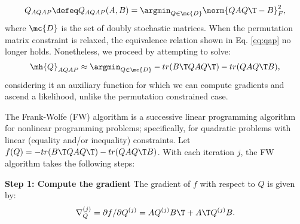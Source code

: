 \documentclass[10pt,journal,cspaper,compsoc]{IEEEtran}
\begin{document}
\begin{align} \label{eq:tqap}
	Q_{AQAP} \defeq Q_{AQAP}(A,B) = \argmin_{Q \in \mc{D}} \norm{Q A Q\T - B}^2_F,
\end{align}
where $\mc{D}$ is the set of doubly stochastic matrices.  When the permutation matrix constraint is relaxed, the equivalence relation shown in Eq. \eqref{eq:qap} no longer holds.  Nonetheless, we proceed by attempting to solve:
\begin{align} \label{eq:nqap}
	\mh{Q}_{AQAP} \approx \argmin_{Q \in \mc{D}} - tr(B\T QAQ\T) - tr(QAQ\T B),
\end{align}
considering it an auxiliary function for which we can compute gradients and ascend a likelihood, unlike the permutation constrained case.  

The Frank-Wolfe (FW) algorithm is a successive linear programming algorithm for nonlinear programming problems; specifically, for quadratic problems with linear (equality and/or inequality) constraints. Let $f(Q)=- tr(B\T QAQ\T) - tr(QAQ\T B)$.  With each iteration $j$, the FW algorithm takes the following steps:

\textbf{Step 1: Compute the gradient} The gradient of $f$ with respect to $Q$ is given by:
\begin{align} \label{eq:grad}
	\nabla_Q^{(j)} = \partial f / \partial Q^{(j)} =  A Q^{(j)} B\T + A\T Q^{(j)} B.
\end{align}

\end{document}
